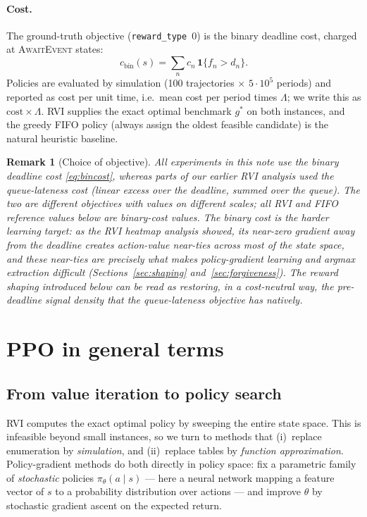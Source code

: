 \documentclass[11pt,a4paper]{article}
\newtheorem{remark}{Remark}
\begin{document}
\paragraph{Cost.}
The ground-truth objective (\texttt{reward\_type}~0) is the binary
deadline cost, charged at \textsc{AwaitEvent} states:
\begin{equation}
  c_{\mathrm{bin}}(s) = \sum_n c_n \,\mathbf{1}\{f_n > d_n\}.
  \label{eq:bincost}
\end{equation}
Policies are evaluated by simulation (100 trajectories $\times$
$5\cdot10^5$ periods) and reported as cost per unit time, i.e.\ mean cost
per period times $\Lambda$; we write this as
$\mathrm{cost}\times\Lambda$.  RVI supplies the exact optimal benchmark
$g^*$ on both instances, and the greedy FIFO policy (always assign the
oldest feasible candidate) is the natural heuristic baseline.

\begin{remark}[Choice of objective]
All experiments in this note use the \emph{binary} deadline cost
\eqref{eq:bincost}, whereas parts of our earlier RVI analysis used the
\emph{queue-lateness} cost (linear excess over the deadline, summed over
the queue).  The two are different objectives with values on different
scales; all RVI and FIFO reference values below are binary-cost values.
The binary cost is the \emph{harder} learning target: as the RVI
heatmap analysis showed, its near-zero gradient away from the deadline
creates action-value near-ties across most of the state space, and
these near-ties are precisely what makes policy-gradient learning and
argmax extraction difficult (Sections~\ref{sec:shaping}
and~\ref{sec:forgiveness}).  The reward shaping introduced below can be
read as restoring, in a cost-neutral way, the pre-deadline signal
density that the queue-lateness objective has natively.
\end{remark}

\section{PPO in general terms}
\label{sec:ppo}

\subsection{From value iteration to policy search}

RVI computes the exact optimal policy by sweeping the entire state space.
This is infeasible beyond small instances, so we turn to methods that
(i)~replace enumeration by \emph{simulation}, and (ii)~replace tables by
\emph{function approximation}.  Policy-gradient methods do both directly
in policy space: fix a parametric family of \emph{stochastic} policies
$\pi_\theta(a \mid s)$ --- here a neural network mapping a feature vector
of $s$ to a probability distribution over actions --- and improve
$\theta$ by stochastic gradient ascent on the expected return.
\end{document}
